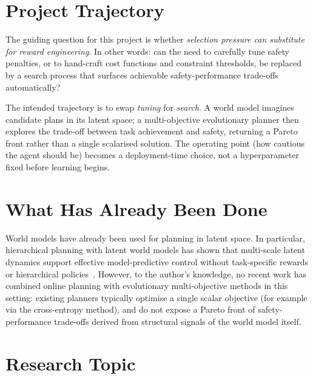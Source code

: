 \documentclass[a4paper,twoside,12pt]{article}
\begin{document}
{}
\tableofcontents
\newpage
{}

\section{Project Trajectory}\label{sec:trajectory}

The guiding question for this project is whether \emph{selection pressure can substitute for reward engineering}.
In other words: can the need to carefully tune safety penalties, or to hand-craft cost functions and constraint thresholds, be replaced by a search process that surfaces achievable safety-performance trade-offs automatically?

The intended trajectory is to swap \emph{tuning} for \emph{search}.
A world model imagines candidate plans in its latent space; a multi-objective evolutionary planner then explores the trade-off between task achievement and safety, returning a Pareto front rather than a single scalarised solution.
The operating point (how cautious the agent should be) becomes a deployment-time choice, not a hyperparameter fixed before learning begins.

\section{What Has Already Been Done}\label{sec:prior}

World models have already been used for planning in latent space.
In particular, hierarchical planning with latent world models has shown that multi-scale latent dynamics support effective model-predictive control without task-specific rewards or hierarchical policies~\citep{zhang2026hwm}.
However, to the author's knowledge, no recent work has combined online planning with evolutionary multi-objective methods in this setting: existing planners typically optimise a single scalar objective (for example via the cross-entropy method), and do not expose a Pareto front of safety-performance trade-offs derived from structural signals of the world model itself.

\section{Research Topic}\label{sec:topic}
\end{document}
